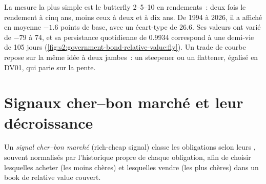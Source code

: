 La mesure la plus simple est le butterfly 2--5--10 en rendements~: deux fois le rendement à cinq ans, moins ceux à deux et à dix ans. De 1994 à 2026, il a affiché en moyenne
$-1.6$ points de base, avec un écart-type de 26.6. Ses valeurs ont varié de $-79$ à 74, et sa persistance quotidienne de 0.9934 correspond à une demi-vie de 105 jours
(\cref{fig:s2:government-bond-relative-value:fly}). Un trade de courbe repose sur la même idée à deux jambes~: un steepener ou un flattener, égalisé en DV01, qui parie sur
la pente.

\begin{omfigure}

\label{fig:s2:government-bond-relative-value:fly}
\end{omfigure}

\section{Signaux cher--bon marché et leur décroissance}

\begin{definition}\label{def:s2:government-bond-relative-value:signal}
Un \emph{signal cher--bon marché} (rich-cheap signal) classe les obligations selon leurs , souvent normalisés par l'historique propre de chaque obligation, afin de choisir
lesquelles acheter (les moins chères) et lesquelles vendre (les plus chères) dans un book de relative value couvert.
\end{definition}


